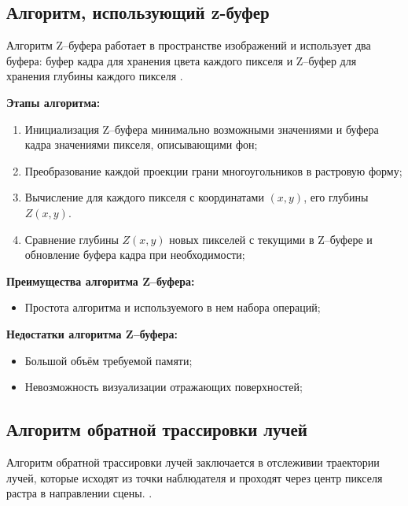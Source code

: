 \subsection{Алгоритм, использующий z-буфер}
Алгоритм Z--буфера работает в пространстве изображений и использует два буфера: буфер кадра для хранения цвета каждого
пикселя и Z--буфер для хранения глубины каждого пикселя \cite{shikinStCG}.

\textbf{Этапы алгоритма:}
\begin{enumerate}[label=\arabic*)]
	\item Инициализация Z--буфера минимально возможными значениями и буфера кадра значениями пикселя, описывающими фон;
	\item Преобразование каждой проекции грани многоугольников в растровую форму;
	\item Вычисление для каждого пикселя с координатами $(x, y)$, его глубины $Z(x, y)$.
	\item Сравнение глубины $Z(x, y)$ новых пикселей с текущими в Z--буфере и обновление буфера кадра при необходимости;
\end{enumerate}

\textbf{Преимущества алгоритма Z--буфера:}
\begin{itemize}
	\item Простота алгоритма и используемого в нем набора операций;
\end{itemize}

\textbf{Недостатки алгоритма Z--буфера:}
\begin{itemize}
	\item Большой объём требуемой памяти;
	\item Невозможность визуализации отражающих поверхностей;
\end{itemize}

\subsection{Алгоритм обратной трассировки лучей}
Алгоритм обратной трассировки лучей заключается в отслеживии траектории лучей, которые исходят из точки наблюдателя и проходят через центр пикселя растра в направлении сцены. \cite{shikinDinamica}.

